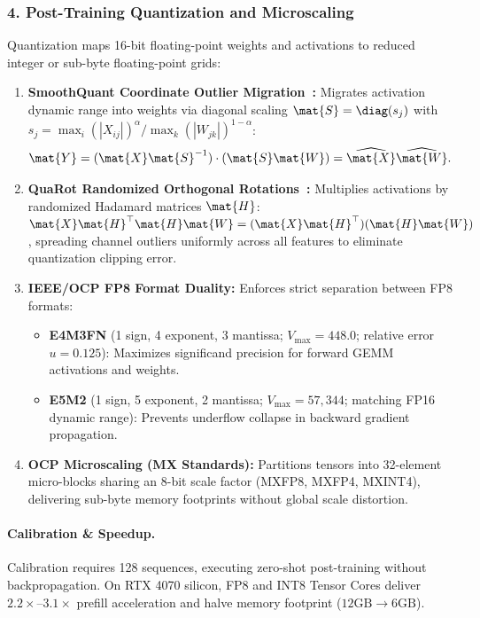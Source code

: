 \subsubsection{4. Post-Training Quantization and Microscaling}
\label{subsubsec:quantization_microscaling}
Quantization maps 16-bit floating-point weights and activations to reduced integer or sub-byte floating-point grids:
\begin{enumerate}
\item \textbf{SmoothQuant Coordinate Outlier Migration~\cite{xiao2023smoothquant}:} Migrates activation dynamic range into weights via diagonal scaling $\mat{S} = \diag(s_j)$ with $s_j = \max_i(|X_{ij}|)^\alpha / \max_k(|W_{jk}|)^{1-\alpha}$:
\begin{equation}
\mat{Y} = (\mat{X}\mat{S}^{-1}) \cdot (\mat{S}\mat{W}) = \widehat{\mat{X}} \widehat{\mat{W}}.
\end{equation}
\item \textbf{QuaRot Randomized Orthogonal Rotations~\cite{ashkboos2024quarot}:} Multiplies activations by randomized Hadamard matrices $\mat{H}$: $\mat{X}\mat{H}^\top \mat{H}\mat{W} = (\mat{X}\mat{H}^\top)(\mat{H}\mat{W})$, spreading channel outliers uniformly across all features to eliminate quantization clipping error.
\item \textbf{IEEE/OCP FP8 Format Duality:} Enforces strict separation between FP8 formats:
\begin{itemize}
\item \textbf{E4M3FN} (1 sign, 4 exponent, 3 mantissa; $V_{\max} = 448.0$; relative error $u = 0.125$): Maximizes significand precision for forward GEMM activations and weights.
\item \textbf{E5M2} (1 sign, 5 exponent, 2 mantissa; $V_{\max} = 57{,}344$; matching FP16 dynamic range): Prevents underflow collapse in backward gradient propagation.
\end{itemize}
\item \textbf{OCP Microscaling (MX Standards):} Partitions tensors into 32-element micro-blocks sharing an 8-bit scale factor (MXFP8, MXFP4, MXINT4), delivering sub-byte memory footprints without global scale distortion.
\end{enumerate}

\paragraph{Calibration \& Speedup.} Calibration requires 128 sequences, executing zero-shot post-training without backpropagation. On RTX 4070 silicon, FP8 and INT8 Tensor Cores deliver $2.2\times\text{--}3.1\times$ prefill acceleration and halve memory footprint ($12\text{GB} \to 6\text{GB}$).

